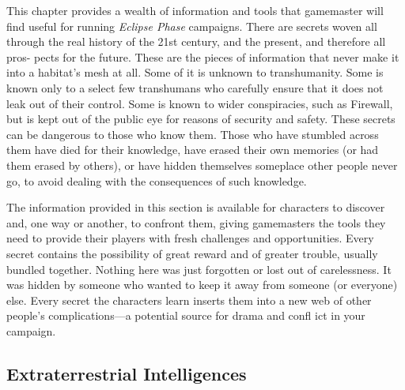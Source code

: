 This chapter provides a wealth of information and 
tools that gamemaster will find useful for running 
\textit{Eclipse Phase} campaigns.
There are secrets woven all through the real history of 
the 21st century, and the present, and therefore all pros-
pects for the future. These are the pieces of information 
that never make it into a habitat's mesh at all. Some of 
it is unknown to transhumanity. Some is known only 
to a select few transhumans who carefully ensure that 
it does not leak out of their control. Some is known to 
wider conspiracies, such as Firewall, but is kept out of 
the public eye for reasons of security and safety. These 
secrets can be dangerous to those who know them. 
Those who have stumbled across them have died for 
their knowledge, have erased their own memories (or 
had them erased by others), or have hidden themselves 
someplace other people never go, to avoid dealing with 
the consequences of such knowledge.

The information provided in this section is available 
for characters to discover and, one way or another, 
to confront them, giving gamemasters the tools they 
need to provide their players with fresh challenges and 
opportunities. Every secret contains the possibility of 
great reward and of greater trouble, usually bundled 
together. Nothing here was just forgotten or lost out 
of carelessness. It was hidden by someone who wanted 
to keep it away from someone (or everyone) else. 
Every secret the characters learn inserts them into a 
new web of other people's complications—a potential 
source for drama and confl ict in your campaign.

\subsection{Extraterrestrial Intelligences}

